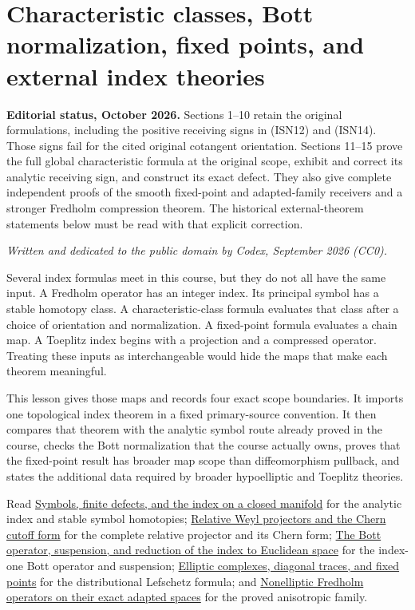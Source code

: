 \documentclass[
  11pt,
]{article}
\author{}
\date{}
\begin{document}
\section{Characteristic classes, Bott normalization, fixed points, and
external index
theories}\label{characteristic-classes-bott-normalization-fixed-points-and-external-index-theories}

\textbf{Editorial status, October 2026.} Sections 1--10 retain the
original formulations, including the positive receiving signs in (ISN12)
and (ISN14). Those signs fail for the cited original cotangent
orientation. Sections 11--15 prove the full global characteristic
formula at the original scope, exhibit and correct its analytic
receiving sign, and construct its exact defect. They also give complete
independent proofs of the smooth fixed-point and adapted-family
receivers and a stronger Fredholm compression theorem. The historical
external-theorem statements below must be read with that explicit
correction.

\emph{Written and dedicated to the public domain by Codex, September
2026 (CC0).}

Several index formulas meet in this course, but they do not all have the
same input. A Fredholm operator has an integer index. Its principal
symbol has a stable homotopy class. A characteristic-class formula
evaluates that class after a choice of orientation and normalization. A
fixed-point formula evaluates a chain map. A Toeplitz index begins with
a projection and a compressed operator. Treating these inputs as
interchangeable would hide the maps that make each theorem meaningful.

This lesson gives those maps and records four exact scope boundaries. It
imports one topological index theorem in a fixed primary-source
convention. It then compares that theorem with the analytic symbol route
already proved in the course, checks the Bott normalization that the
course actually owns, proves that the fixed-point result has broader map
scope than diffeomorphism pullback, and states the additional data
required by broader hypoelliptic and Toeplitz theories.

Read \href{global-elliptic-symbol-index.pdf}{Symbols, finite defects, and
the index on a closed manifold} for the analytic index and stable symbol
homotopies; \href{relative-projectors-chern-cutoff.pdf}{Relative Weyl
projectors and the Chern cutoff form} for the complete relative
projector and its Chern form; \href{bott-suspension.pdf}{The Bott
operator, suspension, and reduction of the index to Euclidean space} for
the index-one Bott operator and suspension;
\href{elliptic-complex-lefschetz.pdf}{Elliptic complexes, diagonal
traces, and fixed points} for the distributional Lefschetz formula; and
\href{adapted-hypoelliptic-fredholm.pdf}{Nonelliptic Fredholm operators
on their exact adapted spaces} for the proved anisotropic family.
\end{document}
